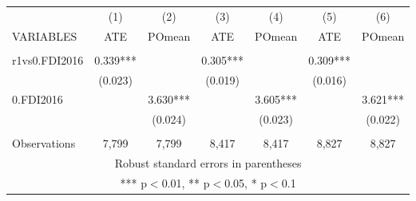 \documentclass[]{article}
\begin{document}
\begin{tabular}{lcccccc} \hline
 & (1) & (2) & (3) & (4) & (5) & (6) \\
VARIABLES & ATE & POmean & ATE & POmean & ATE & POmean \\ \hline
 &  &  &  &  &  &  \\
r1vs0.FDI2016 & 0.339*** &  & 0.305*** &  & 0.309*** &  \\
 & (0.023) &  & (0.019) &  & (0.016) &  \\
0.FDI2016 &  & 3.630*** &  & 3.605*** &  & 3.621*** \\
 &  & (0.024) &  & (0.023) &  & (0.022) \\
 &  &  &  &  &  &  \\
 Observations & 7,799 & 7,799 & 8,417 & 8,417 & 8,827 & 8,827 \\ \hline
\multicolumn{7}{c}{ Robust standard errors in parentheses} \\
\multicolumn{7}{c}{ *** p$<$0.01, ** p$<$0.05, * p$<$0.1} \\
\end{tabular}
\end{document}
